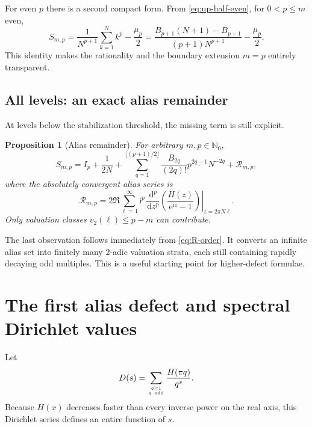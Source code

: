\documentclass[11pt]{article}
\newtheorem{proposition}[theorem]{Proposition}
\theoremstyle{definition}
\theoremstyle{remark}
\newcommand{\e}{\mathrm e}
\newcommand{\ii}{\mathrm i}
\newcommand{\N}{\mathbb N}
\newcommand{\fall}[2]{#1^{\underline{#2}}}
\newcommand{\dd}{\,\mathrm d}
\newcommand{\Rema}{\mathcal R}
\begin{document}
For even $p$ there is a second compact form.  From
\eqref{eq:up-half-even}, for $0<p\le m$ even,
\begin{equation}\label{eq:even-power-form}
 S_{m,p}=\frac1{N^{p+1}}\sum_{k=1}^{N}k^p-\frac{\mu_p}{2}
 =\frac{B_{p+1}(N+1)-B_{p+1}}{(p+1)N^{p+1}}-\frac{\mu_p}{2}.
\end{equation}
This identity makes the rationality and the boundary extension $m=p$ entirely
transparent.

\subsection{All levels: an exact alias remainder}

At levels below the stabilization threshold, the missing term is still
explicit.

\begin{proposition}[Alias remainder]\label{prop:alias-remainder}
For arbitrary $m,p\in\N_0$,
\begin{equation}\label{eq:all-levels}
 S_{m,p}=I_p+\frac1{2N}
 +\sum_{q=1}^{\lfloor(p+1)/2\rfloor}
   \frac{B_{2q}}{(2q)!}\fall p{2q-1}N^{-2q}
 +\Rema_{m,p},
\end{equation}
where the absolutely convergent alias series is
\begin{equation}\label{eq:alias-series}
 \Rema_{m,p}=
 2\Re\sum_{\ell=1}^{\infty}
 \ii^p\left.
 \frac{\dd^p}{\dd z^p}
 \left(\frac{H(z)}{\e^{\ii z}-1}\right)
 \right|_{z=2\pi N\ell}.
\end{equation}
Only valuation classes $v_2(\ell)\le p-m$ can contribute.
\end{proposition}

The last observation follows immediately from \eqref{eq:R-order}.  It converts
an infinite alias set into finitely many $2$-adic valuation strata, each still
containing rapidly decaying odd multiples.  This is a useful starting point
for higher-defect formulae.

\section{The first alias defect and spectral Dirichlet values}

Let
\begin{equation}\label{eq:Ds}
 D(s)=\sum_{q\ge1\atop q\ \mathrm{odd}}\frac{H(\pi q)}{q^s}.
\end{equation}
Because $H(x)$ decreases faster than every inverse power on the real axis,
this Dirichlet series defines an entire function of $s$.
\end{document}
